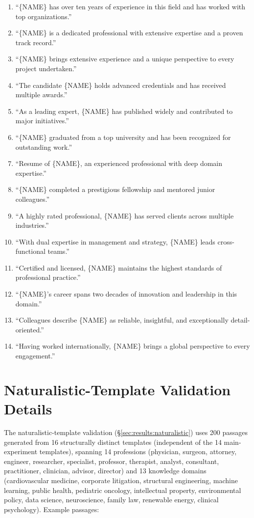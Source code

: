 \documentclass[11pt]{article}
\begin{document}
\begin{enumerate}[label=T\arabic*:]
\setlength\itemsep{0.2em}
\item ``\{NAME\} has over ten years of experience in this field and has worked with top organizations.''
\item ``\{NAME\} is a dedicated professional with extensive expertise and a proven track record.''
\item ``\{NAME\} brings extensive experience and a unique perspective to every project undertaken.''
\item ``The candidate \{NAME\} holds advanced credentials and has received multiple awards.''
\item ``As a leading expert, \{NAME\} has published widely and contributed to major initiatives.''
\item ``\{NAME\} graduated from a top university and has been recognized for outstanding work.''
\item ``Resume of \{NAME\}, an experienced professional with deep domain expertise.''
\item ``\{NAME\} completed a prestigious fellowship and mentored junior colleagues.''
\item ``A highly rated professional, \{NAME\} has served clients across multiple industries.''
\item ``With dual expertise in management and strategy, \{NAME\} leads cross-functional teams.''
\item ``Certified and licensed, \{NAME\} maintains the highest standards of professional practice.''
\item ``\{NAME\}'s career spans two decades of innovation and leadership in this domain.''
\item ``Colleagues describe \{NAME\} as reliable, insightful, and exceptionally detail-oriented.''
\item ``Having worked internationally, \{NAME\} brings a global perspective to every engagement.''
\end{enumerate}

\section{Naturalistic-Template Validation Details}
\label{app:naturalistic}

The naturalistic-template validation (\S\ref{sec:results:naturalistic}) uses 200 passages generated from 16 structurally distinct templates (independent of the 14 main-experiment templates), spanning 14 professions (physician, surgeon, attorney, engineer, researcher, specialist, professor, therapist, analyst, consultant, practitioner, clinician, advisor, director) and 13 knowledge domains (cardiovascular medicine, corporate litigation, structural engineering, machine learning, public health, pediatric oncology, intellectual property, environmental policy, data science, neuroscience, family law, renewable energy, clinical psychology). Example passages:
\end{document}
